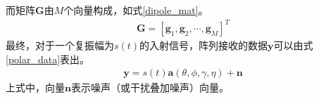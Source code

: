 \documentclass[master]{thesis-uestc}
\begin{document}
而矩阵$\bm{G}$由$M$个向量构成，如式\eqref{dipole_mat}。
\begin{equation}\label{dipole_mat}
    \begin{aligned}
        \bm{G}=\left[\bm{g}_{1}, \bm{g}_{2}, \cdots, \bm{g}_{M}\right]^{T}
    \end{aligned}
\end{equation}
最终，对于一个复振幅为$s(t)$的入射信号，阵列接收的数据$\bm{y}$可以由式\eqref{polar_data}表出。
\begin{equation}\label{polar_data}
    \begin{aligned}
        \bm{y}=s(t) \bm{a}(\theta, \phi, \gamma, \eta)+\bm{n}
    \end{aligned}
\end{equation}
上式中，向量$\bm{n}$表示噪声（或干扰叠加噪声）向量。
\end{document}
